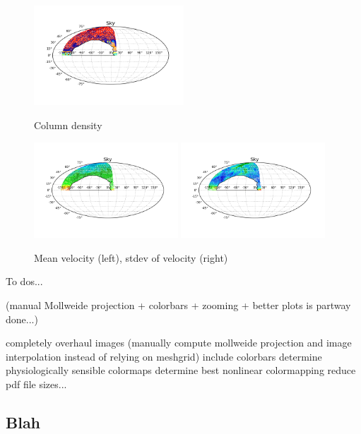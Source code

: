 \documentclass[10pt]{article}
\begin{document}
\begin{figure}[!ht]
    \centering
    \includegraphics[width=0.5\textwidth]{plots/col_density.png} \\
    \caption{Column density}
    \label{fig:fuck1}
\end{figure}
\begin{figure}[!ht]
    \centering
    \includegraphics[width=0.48\textwidth]{plots/veloc_mean.png}
    \includegraphics[width=0.48\textwidth]{plots/veloc_std.png} \\
    \caption{Mean velocity (left), stdev of velocity (right)}
    \label{fig:fuck2}
\end{figure}

To dos...

(manual Mollweide projection + colorbars + zooming + better plots is partway done...)

completely overhaul images (manually compute mollweide projection and image interpolation instead of relying on meshgrid)
include colorbars
determine physiologically sensible colormaps
determine best nonlinear colormapping
reduce pdf file sizes...

\subsection{Blah}
\end{document}
